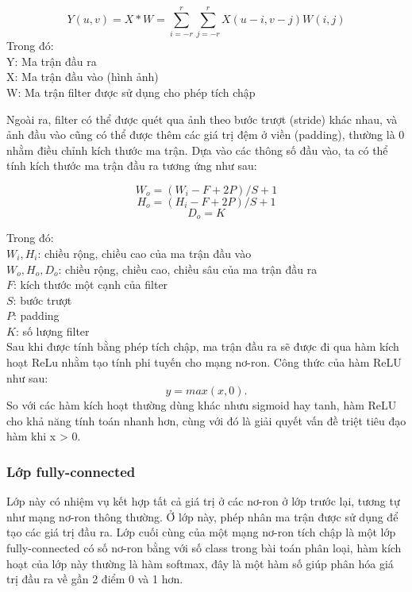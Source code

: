 \documentclass[a4paper,14pt]{extreport}
\begin{document}
\[ Y(u,v) = X*W = \sum_{i=-r}^{r} \sum_{j=-r}^{r} X(u - i,v - j)W(i,j) \]
Trong đó: \\
Y: Ma trận đầu ra \\
X: Ma trận đầu vào (hình ảnh) \\
W: Ma trận filter được sử dụng cho phép tích chập

Ngoài ra, filter có thể được quét qua ảnh theo bước trượt (stride) khác nhau, và ảnh đầu vào cũng có 
thể được thêm các giá trị đệm ở viền (padding), thường là 0 nhằm điều chỉnh kích thước ma trận. Dựa vào 
các thông số đầu vào, ta có thể tính kích thước ma trận đầu ra tương ứng như sau:

\[ W_o = (W_i - F + 2P) / S + 1 \]
\[ H_o = (H_i - F + 2P) / S + 1 \]
\[ D_o = K \]

Trong đó: \\
$ W_i, H_i $: chiều rộng, chiều cao của ma trận đầu vào \\
$ W_o, H_o, D_o $: chiều rộng, chiều cao, chiều sâu của ma trận đầu ra \\
$ F $: kích thước một cạnh của filter \\
$ S $: bước trượt \\
$ P $: padding \\
$ K $: số lượng filter \\

Sau khi được tính bằng phép tích chập, ma trận đầu ra sẽ được đi qua hàm kích hoạt ReLu nhằm tạo 
tính phi tuyến cho mạng nơ-ron. Công thức của hàm ReLU như sau:
\[ y = max(x, 0). \]
So với các hàm kích hoạt thường dùng khác nhưu sigmoid hay tanh, hàm ReLU cho khả năng tính toán nhanh hơn, 
cùng với đó là giải quyết vấn đề triệt tiêu đạo hàm khi x > 0.
\subsubsection*{Lớp fully-connected}
Lớp này có nhiệm vụ kết hợp tất cả giá trị ở các nơ-ron ở lớp trước lại, tương tự như mạng nơ-ron thông thường. 
Ở lớp này, phép nhân ma trận được sử dụng để tạo các giá trị đầu ra. Lớp cuối cùng của một mạng nơ-ron tích 
chập là một lớp fully-connected có số nơ-ron bằng với số class trong bài toán phân loại, hàm kích hoạt của 
lớp này thường là hàm softmax, đây là một hàm số giúp phân hóa giá trị đầu ra về gần 2 điểm 0 và 1 hơn.
\end{document}
